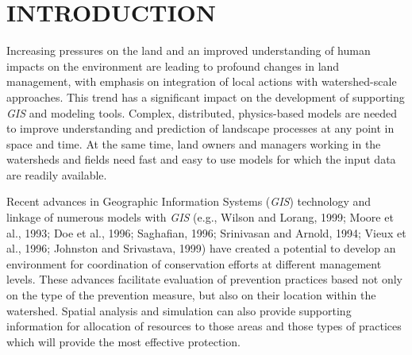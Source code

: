 \documentclass{kapedbk} %
\begin{document}


\author{Helena Mitasova$^1$ and Lubos Mitas$^2$}

\bigskip
\bigskip
\bigskip
\noindent
\section{INTRODUCTION}

Increasing pressures on the land and an improved understanding of human
impacts on the environment are leading to profound changes in land management,
with emphasis on integration of local actions with watershed-scale approaches.
This trend has a significant impact on the development of supporting {\sl GIS}
and modeling tools. Complex, distributed, physics-based models
are needed to improve understanding and prediction of landscape
processes at any point in space and time. At the
same time, land owners and managers working in the watersheds and
fields need fast and easy to use models for which the input data are readily available.

Recent advances in Geographic Information Systems ({\sl GIS}) technology and
linkage of numerous models with {\sl GIS} (e.g., Wilson and Lorang, 1999;
Moore et al., 1993; Doe et al., 1996; Saghafian, 1996;
Srinivasan and Arnold, 1994; Vieux et al., 1996; Johnston and Srivastava, 1999)
have created a potential to develop an environment
for coordination of conservation efforts at different management
levels.
These advances facilitate evaluation of prevention practices
based not only on the type of the prevention measure, but also on their
location within the watershed. Spatial analysis and simulation can also
provide supporting information for allocation of resources to those areas
and those types of practices which will provide the most effective protection.
\end{document}

